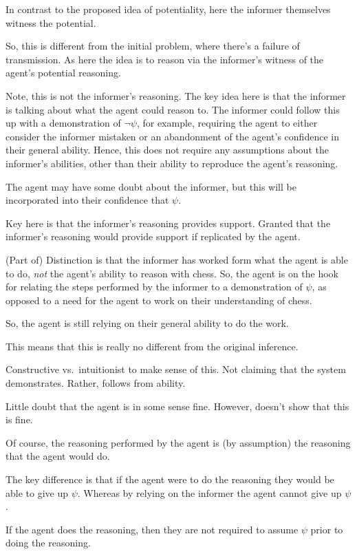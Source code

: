 \documentclass[10pt]{article}
\begin{document}
In contrast to the proposed idea of potentiality, here the informer themselves witness the potential.

So, this is different from the initial problem, where there's a failure of transmission.
As here the idea is to reason via the informer's witness of the agent's potential reasoning.

Note, this is not the informer's reasoning.
The key idea here is that the informer is talking about what the agent could reason to.
The informer could follow this up with a demonstration of \(\lnot\psi\), for example, requiring the agent to either consider the informer mistaken or an abandonment of the agent's confidence in their general ability.
Hence, this does not require any assumptions about the informer's abilities, other than their ability to reproduce the agent's reasoning.

The agent may have some doubt about the informer, but this will be incorporated into their confidence that \(\psi\).

Key here is that the informer's reasoning provides support.
Granted that the informer's reasoning would provide support if replicated by the agent.

(Part of) Distinction is that the informer has worked form what the agent is able to do, \emph{not} the agent's ability to reason with chess.
So, the agent is on the hook for relating the steps performed by the informer to a demonstration of \(\psi\), as opposed to a need for the agent to work on their understanding of chess.

So, the agent is still relying on their general ability to do the work.

This means that this is really no different from the original inference.


Constructive vs.\ intuitionist to make sense of this.
Not claiming that the system demonstrates.
Rather, follows from ability.

Little doubt that the agent is in some sense fine.
However, doesn't show that this is fine.

Of course, the reasoning performed by the agent is (by assumption) the reasoning that the agent would do.
{
  \color{red}
  The key difference is that if the agent were to do the reasoning they would be able to give up \(\psi\).
  Whereas by relying on the informer the agent cannot give up \(\psi\).

  If the agent does the reasoning, then they are not required to assume \(\psi\) prior to doing the reasoning.
}
\end{document}

